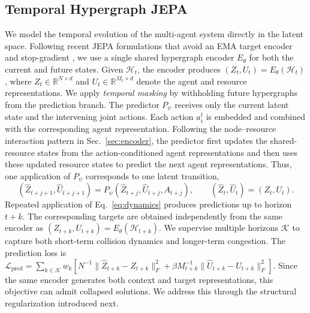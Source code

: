 \documentclass{article} %
\begin{document}
\subsection{Temporal Hypergraph JEPA} \label{sec:jepa} We model the temporal evolution of the multi-agent system directly in the latent space. Following recent JEPA formulations that avoid an EMA target encoder and stop-gradient \cite{kuhn2026levjepa}, we use a single shared hypergraph encoder $E_\theta$ for both the current and future states. Given $\mathcal{H}_t$, the encoder produces $(Z_t,U_t)=E_\theta(\mathcal{H}_t)$, where $Z_t\in\mathbb{R}^{N\times d}$ and $U_t\in\mathbb{R}^{M_t\times d}$ denote the agent and resource representations. We apply \emph{temporal masking} by withholding future hypergraphs from the prediction branch. The predictor $P_\psi$ receives only the current latent state and the intervening joint actions. Each action $a_i^t$ is embedded and combined with the corresponding agent representation. Following the node--resource interaction pattern in Sec.~\ref{sec:encoder}, the predictor first updates the shared-resource states from the action-conditioned agent representations and then uses these updated resource states to predict the next agent representations. Thus, one application of $P_\psi$ corresponds to one latent transition, \begin{equation} (\widehat Z_{t+j+1},\widehat U_{t+j+1}) = P_\psi(\widehat Z_{t+j},\widehat U_{t+j},A_{t+j}), \qquad (\widehat Z_t,\widehat U_t)=(Z_t,U_t). \label{eq:dynamics} \end{equation} Repeated application of Eq.~\eqref{eq:dynamics} produces predictions up to horizon $t+k$. The corresponding targets are obtained independently from the same encoder as $(Z_{t+k},U_{t+k})=E_\theta(\mathcal{H}_{t+k})$. We supervise multiple horizons $\mathcal{K}$ to capture both short-term collision dynamics and longer-term congestion. The prediction loss is $\mathcal{L}_{\mathrm{pred}}=\sum_{k\in\mathcal{K}} w_k\!\left[N^{-1}\|\widehat Z_{t+k}-Z_{t+k}\|_F^2+\beta M_{t+k}^{-1}\|\widehat U_{t+k}-U_{t+k}\|_F^2\right]$. Since the same encoder generates both context and target representations, this objective can admit collapsed solutions. We address this through the structural regularization introduced next.
\end{document}
